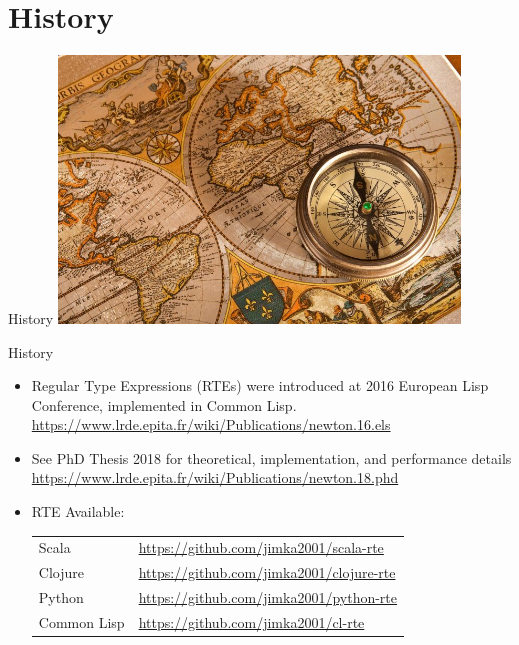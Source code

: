 \section{History}
{  %
\begin{frame}{History}
  \centering
  \includegraphics[width=0.8\textwidth]{history.jpg}
\end{frame}
}
\begin{frame}{History}
  \begin{itemize}
  \item Regular Type Expressions (RTEs) were introduced at 2016 European Lisp Conference, implemented in Common Lisp.
    \url{https://www.lrde.epita.fr/wiki/Publications/newton.16.els}
  \item See PhD Thesis 2018 for theoretical, implementation, and performance details
    \url{https://www.lrde.epita.fr/wiki/Publications/newton.18.phd}
  \item   RTE Available:

    \medskip
    
  \begin{tabular}{ll}
    Scala & \url{https://github.com/jimka2001/scala-rte}\\
    Clojure & \url{https://github.com/jimka2001/clojure-rte}\\
    Python & \url{https://github.com/jimka2001/python-rte}\\
    Common Lisp & \url{https://github.com/jimka2001/cl-rte}    
  \end{tabular}
  \end{itemize}
\end{frame}


